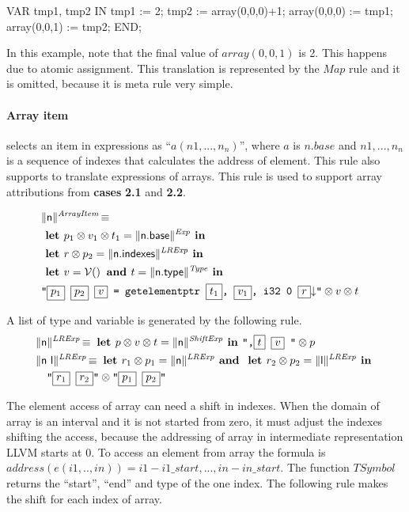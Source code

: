 \documentclass{llncs}
\newcommand{\trad}[2]{\ensuremath{\lVert \textsf{#1} \rVert^{\textit{#2}}}}
\newcommand{\nl}[0]{\ensuremath{\downarrow}}
\DeclareMathOperator{\isdef}{\equiv}
\DeclareMathOperator{\variable}{\mathcal{V}()}
\newcommand{\llvm}[1]{\texttt{#1}}
\newcommand{\B}[1]{\textsf{#1}}
\newcommand{\LET}[0]{\textbf{ let }}
\newcommand{\IN}[0]{\textbf{ in }}
\newcommand{\AND}[0]{\textbf{ and }}
\newcommand{\PH}[1]{\framebox{$#1$}}
\newcommand{\sep}[0]{\otimes}
\begin{document}
\begin{pascalcode}
VAR tmp1, tmp2 IN
tmp1 := 2;
tmp2 := array(0,0,0)+1;
array(0,0,0) := tmp1;
array(0,0,1) := tmp2;
END;
\end{pascalcode}

In this example, note that the final value of $array(0,0,1)$ is 2. This 
happens due to atomic assignment. This translation is represented by the 
$Map$ rule and it is omitted, because it is meta rule very simple.


\paragraph{Array item} selects an item in expressions as ``$a(n1,...,n_{n})$'', 
where $a$ is $n.base$ and $n1,...,n_{n}$ is a sequence of indexes that 
calculates the address of element. This rule also supports to translate 
expressions of arrays. This rule is used to support array attributions 
from \textbf{cases} \textbf{2.1} and \textbf{2.2}.

\begin{align*}
\lefteqn{\trad{n}{ArrayItem} \isdef} \\
&  \LET p_1 \sep v_1 \sep t_1  = \trad{n.base}{Exp}  \IN \\
&  \LET r \sep p_2  = \trad{n.indexes}{LRExp}  \IN \\
&  \LET v =  \variable \AND  t = \trad{\B{n.type}}{Type}  \IN \\
&  \llvm{"\PH{p_1} \PH{p_2} \PH{v} =  getelementptr \PH{t_1}, \PH{v_1}, i32 0 \PH{r}\nl"}  \sep v \sep t\\
\end{align*}

A list of type and variable is generated by the following rule.
\begin{align*}
&\trad{n}{LRExp} \isdef \LET p \sep v \sep t  = \trad{n}{ShiftExp}  \IN  \llvm{",\PH{t} \PH{v} "} \sep p\\
&\trad{n l}{LRExp} \isdef \LET r_1 \sep p_1 = \trad{n}{LRExp} \AND
 \LET r_2 \sep p_2 = \trad{l}{LRExp} \IN\\
& \quad  \llvm{"\PH{r_1} \PH{r_2}"} \sep \llvm{"\PH{p_1} \PH{p_2}"}\\
\end{align*}


The element access of array can need a shift in indexes. When the domain of 
array is an interval and it is not started from zero, it must adjust the 
indexes shifting the access, because the addressing  of array in intermediate 
representation LLVM starts at 0. To access an element from array the formula is 
$address(e(i1,..,in))  = i1-i1\_start, ... , in-in\_start$. The function $TSymbol$
returns the ``start'', ``end'' and type of the one index. The following rule 
makes the shift for each index of array.
\end{document}
